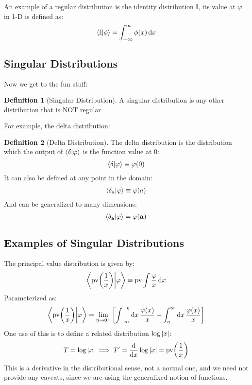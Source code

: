 \documentclass[12pt]{article}
\theoremstyle{plain}
\theoremstyle{definition}
\newtheorem{definition}{Definition}[section]
\newcommand{\vphi}{\varphi}
\begin{document}
An example of a regular distribution is the identity distribution $\mathbb{I}$, its value at $\vphi$ in 1-D is defined as:
\begin{align*}
  \ip{\mathbb{I}}{\phi}=\int_{-\infty}^\infty\phi(x)\dd{x}
\end{align*}

\subsection{Singular Distributions}
Now we get to the fun stuff:
\begin{definition}[Singular Distribution]
  A singular distribution is any other distribution that is NOT regular 
\end{definition}
For example, the delta distribution:
\begin{definition}[Delta Distribution]
  The delta distribution is the distribution which the output of $\ip{\delta}{\vphi}$ is the function value at $0$:
  \begin{align*}
    \ip{\delta}{\vphi}\equiv\vphi(0)
  \end{align*}
  It can also be defined at any point in the domain:
  \begin{align*}
    \ip{\delta_a}{\vphi}\equiv\vphi(a)
  \end{align*}
  And can be generalized to many dimensions:
  \begin{align*}
    \ip{\delta_{\vb{a}}}{\vphi}=\vphi(\vb{a})
  \end{align*}
\end{definition}

\subsection{Examples of Singular Distributions}
The principal value distribution is given by:
\begin{align*}
  \ip{\mathrm{pv}\qty(\frac1x)}{\vphi}\equiv\mathrm{pv}\int\frac{\vphi}x\dd{x}
\end{align*}
Parameterized as:
\begin{align*}
  \ip{\mathrm{pv}\qty(\frac1x)}{\vphi}=\lim_{\eta\to0^+}
  \qty[\int_{-\infty}^{-\eta}\dd{x}\frac{\vphi(x)}{x}+
  \int_\eta^\infty\dd{x}\frac{\vphi(x)}{x}]
\end{align*}
One use of this is to define a related distribution $\log\abs{x}$:
\begin{align*}
  T=\log\abs{x}\implies T'=\dv{x}\log\abs{x}=\mathrm{pv}\qty(\frac1x)
\end{align*}
This is a derivative in the distributional sense, not a normal one, and we need not provide any caveats, since we are using the generalixed notion of functions.
\end{document}
